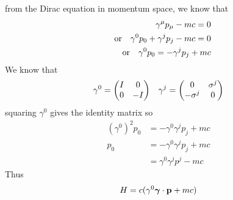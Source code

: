 \documentclass[../main.tex]{subfiles}
\begin{document}
from the Dirac equation in momentum space, we know that
\begin{align*}
    \gamma^\mu p_\mu - mc = 0 \\
    \qor \gamma^0 p_0 + \gamma^j p_j - mc = 0 \\
    \qor \gamma^0 p_0 = -\gamma^j p_j + mc
\end{align*}
We know that
\begin{align*}
    \gamma^0 = \mqty(I & 0 \\ 0 & -I) \quad \gamma^j = \mqty(0 & \sigma^j \\ -\sigma^j & 0)
\end{align*}
squaring $\gamma^0$ gives the identity matrix so
\begin{align*}
    (\gamma^0)^2 p_0 &= - \gamma^0 \gamma^j p_j + mc \\
    p_0 &= - \gamma^0 \gamma^j p_j + mc \\
    &= \gamma^0 \gamma^j p^j - mc
\end{align*}
Thus
\begin{align*}
    H = c (\gamma^0 \vb*\gamma \cdot \vb p + mc)
\end{align*}
\end{document}
